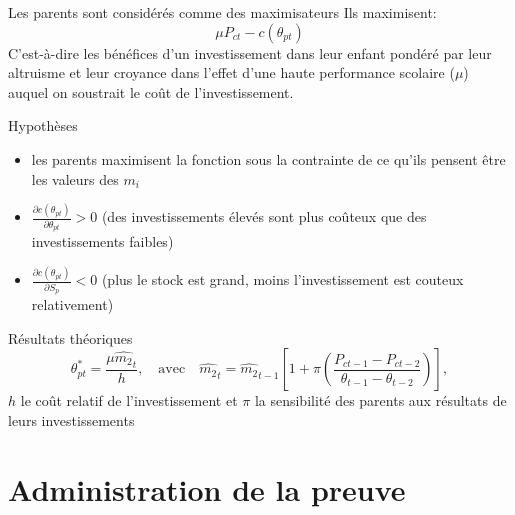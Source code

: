 \documentclass[9pt]{beamer}
\begin{document}
\begin{frame}
	\begin{alertblock}{Les parents sont considérés comme des maximisateurs}
	Ils maximisent:
		\begin{equation*}
		\mu P_{ct}-c(\theta_{pt})
		\end{equation*}
	C'est-à-dire les bénéfices d'un investissement dans leur enfant pondéré par leur altruisme et leur croyance dans l'effet d'une haute performance scolaire ($\mu$) auquel on soustrait le coût de l'investissement.
	\end{alertblock}
	\begin{block}{Hypothèses}
		\begin{itemize}
		\item les parents maximisent la fonction sous la contrainte de ce qu'ils pensent être les valeurs des $m_i$
		\item $\frac{\partial c(\theta_{pt})}{\partial\theta_{pt}}> 0$ (des investissements élevés sont plus coûteux que des investissements faibles)
		\item $\frac{\partial c(\theta_{pt})}{\partial S_{p}}< 0$ (plus le stock est grand, moins l'investissement est couteux relativement)
		\end{itemize}
	\end{block}
	\begin{block}{Résultats théoriques}
	\begin{equation*}
	\theta^*_{pt}=\frac{\mu \hat{m_2}_t}{h},\quad \text{avec}\quad \hat{m_2}_t=\hat{m_2}_{t-1}\left[1+\pi\left(\frac{P_{ct-1}-P_{ct-2}}{\theta_{t-1}-\theta_{t-2}}\right)\right],
	\end{equation*}
	$h$ le coût relatif de l'investissement et $\pi$ la sensibilité des parents aux résultats de leurs investissements
	\end{block}
\end{frame}

\section{Administration de la preuve}
\end{document}

